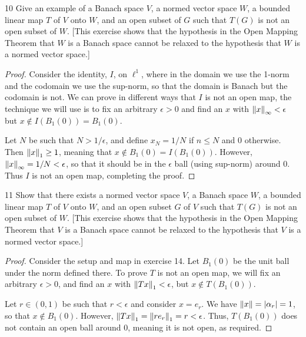 \begin{exercise}{10}
Give an example of a Banach space $V$, a normed vector space $W$, a bounded linear map $T$ of $V$ onto $W$, and an open subset of $G$ such that $T(G)$ is not an open subset of $W$.
[This exercise shows that the hypothesis in the Open Mapping Theorem that $W$ is a Banach space cannot be relaxed to the hypothesis that $W$ is a normed vector space.]
\end{exercise}
\begin{proof}
Consider the identity, $I$, on $\ell^1$, where in the domain we use the 1-norm and the codomain we use the sup-norm, so that the domain is Banach but the codomain is not.
We can prove in different ways that $I$ is not an open map, the technique we will use is to fix an arbitrary $\epsilon > 0$ and find an $x$ with $\left\lVert x\right\rVert_\infty < \epsilon$ but $x \notin I(B_1(0)) = B_1(0)$.

Let $N$ be such that $N > 1/\epsilon$, and define $x_N = 1/N$ if $n \leq N$ and $0$ otherwise.
Then $\left\lVert x\right\rVert_1 \geq 1$, meaning that $x \notin B_1(0) = I(B_1(0))$.
However, $\left\lVert x\right\rVert_\infty = 1/N < \epsilon$, so that it should be in the $\epsilon$ ball (using sup-norm) around 0.
Thus $I$ is not an open map, completing the proof.
\end{proof} 

\begin{exercise}{11}
Show that there exists a normed vector space $V$, a Banach space $W$, a bounded linear map $T$ of $V$ onto $W$, and an open subset $G$ of $V$ such that $T(G)$ is not an open subset of $W$.
[This exercise shows that the hypothesis in the Open Mapping Theorem that $V$ is a Banach space cannot be relaxed to the hypothesis that $V$ is a normed vector space.]
\end{exercise}
\begin{proof}
Consider the setup and map in exercise 14.
Let $B_1(0)$ be the unit ball under the norm defined there.
To prove $T$ is not an open map, we will fix an arbitrary $\epsilon > 0$, and find an $x$ with $\left\lVert Tx\right\rVert_1 < \epsilon$, but $x \notin T(B_1(0))$.

Let $r \in (0, 1)$ be such that $r < \epsilon$ and consider $x = e_r$.
We have $\left\lVert x\right\rVert = \left\lvert \alpha_r\right\rvert = 1$, so that $x \notin B_1(0)$.
However, $\left\lVert Tx\right\rVert_1 = \left\lVert r e_r\right\rVert_1 = r < \epsilon$.
Thus, $T(B_1(0))$ does not contain an open ball around 0, meaning it is not open, as required.
\end{proof} 

